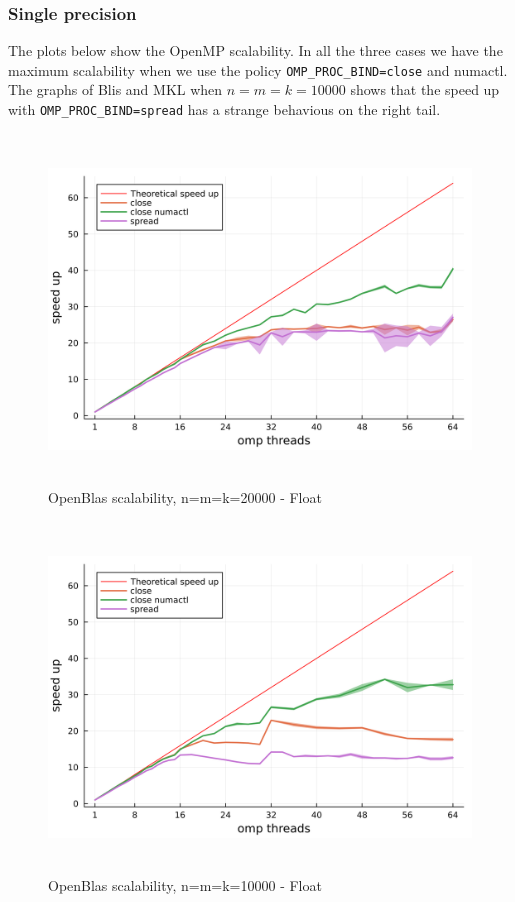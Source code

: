 \documentclass[
  letterpaper,
  DIV=11,
  numbers=noendperiod]{scrartcl}
\begin{document}
\hypertarget{single-precision}{%
\subsubsection{Single precision}\label{single-precision}}

The plots below show the OpenMP scalability. In all the three cases we
have the maximum scalability when we use the policy
\texttt{OMP\_PROC\_BIND=close} and numactl. The graphs of Blis and MKL
when \(n=m=k=10000\) shows that the speed up with
\texttt{OMP\_PROC\_BIND=spread} has a strange behavious on the right
tail.

\begin{figure}

{\centering \includegraphics[width=\textwidth,height=3.64583in]{img/oblas_scalability_20000.png}

}

\caption{OpenBlas scalability, n=m=k=20000 - Float}

\end{figure}

\begin{figure}

{\centering \includegraphics[width=\textwidth,height=3.64583in]{img/oblas_scalability_10000.png}

}

\caption{OpenBlas scalability, n=m=k=10000 - Float}

\end{figure}
\end{document}
